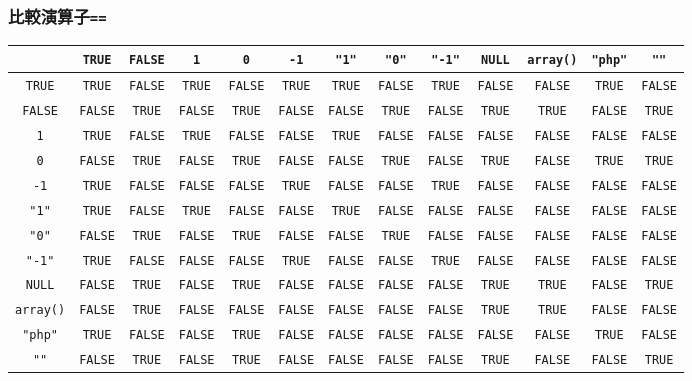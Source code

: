 \begin{frame}[containsverbatim]
\frametitle{比較演算子\texttt{==}}\tiny
\setlength{\tabcolsep}{0.2em}
\begin{center}
  \begin{tabular}{|*{13}{c|}}\hline
 &\verb+TRUE+&\verb+FALSE+&\verb+1+&\verb+0+&\verb+-1+&\verb+"1"+&\verb+"0"+&\verb+"-1"+&\verb+NULL+&\verb+array()+&\verb+"php"+&\verb+""+\\\hline
\verb+TRUE+&\verb+TRUE+&\verb+FALSE+&\verb+TRUE+&\verb+FALSE+&\verb+TRUE+&\verb+TRUE+&\verb+FALSE+&\verb+TRUE+&\verb+FALSE+&\verb+FALSE+&\verb+TRUE+&\verb+FALSE+\\\hline
\verb+FALSE+&\verb+FALSE+&\verb+TRUE+&\verb+FALSE+&\verb+TRUE+&\verb+FALSE+&\verb+FALSE+&\verb+TRUE+&\verb+FALSE+&\verb+TRUE+&\verb+TRUE+&\verb+FALSE+&\verb+TRUE+\\\hline
\verb+1+&\verb+TRUE+&\verb+FALSE+&\verb+TRUE+&\verb+FALSE+&\verb+FALSE+&\verb+TRUE+&\verb+FALSE+&\verb+FALSE+&\verb+FALSE+&\verb+FALSE+&\verb+FALSE+&\verb+FALSE+\\\hline
\verb+0+&\verb+FALSE+&\verb+TRUE+&\verb+FALSE+&\verb+TRUE+&\verb+FALSE+&\verb+FALSE+&\verb+TRUE+&\verb+FALSE+&\verb+TRUE+&\verb+FALSE+&\verb+TRUE+&\verb+TRUE+\\\hline
\verb+-1+&\verb+TRUE+&\verb+FALSE+&\verb+FALSE+&\verb+FALSE+&\verb+TRUE+&\verb+FALSE+&\verb+FALSE+&\verb+TRUE+&\verb+FALSE+&\verb+FALSE+&\verb+FALSE+&\verb+FALSE+\\\hline
\verb+"1"+&\verb+TRUE+&\verb+FALSE+&\verb+TRUE+&\verb+FALSE+&\verb+FALSE+&\verb+TRUE+&\verb+FALSE+&\verb+FALSE+&\verb+FALSE+&\verb+FALSE+&\verb+FALSE+&\verb+FALSE+\\\hline
\verb+"0"+&\verb+FALSE+&\verb+TRUE+&\verb+FALSE+&\verb+TRUE+&\verb+FALSE+&\verb+FALSE+&\verb+TRUE+&\verb+FALSE+&\verb+FALSE+&\verb+FALSE+&\verb+FALSE+&\verb+FALSE+\\\hline
\verb+"-1"+&\verb+TRUE+&\verb+FALSE+&\verb+FALSE+&\verb+FALSE+&\verb+TRUE+&\verb+FALSE+&\verb+FALSE+&\verb+TRUE+&\verb+FALSE+&\verb+FALSE+&\verb+FALSE+&\verb+FALSE+\\\hline
\verb+NULL+&\verb+FALSE+&\verb+TRUE+&\verb+FALSE+&\verb+TRUE+&\verb+FALSE+&\verb+FALSE+&\verb+FALSE+&\verb+FALSE+&\verb+TRUE+&\verb+TRUE+&\verb+FALSE+&\verb+TRUE+\\\hline
\verb+array()+&\verb+FALSE+&\verb+TRUE+&\verb+FALSE+&\verb+FALSE+&\verb+FALSE+&\verb+FALSE+&\verb+FALSE+&\verb+FALSE+&\verb+TRUE+&\verb+TRUE+&\verb+FALSE+&\verb+FALSE+\\\hline
\verb+"php"+&\verb+TRUE+&\verb+FALSE+&\verb+FALSE+&\verb+TRUE+&\verb+FALSE+&\verb+FALSE+&\verb+FALSE+&\verb+FALSE+&\verb+FALSE+&\verb+FALSE+&\verb+TRUE+&\verb+FALSE+\\\hline
\verb+""+&\verb+FALSE+&\verb+TRUE+&\verb+FALSE+&\verb+TRUE+&\verb+FALSE+&\verb+FALSE+&\verb+FALSE+&\verb+FALSE+&\verb+TRUE+&\verb+FALSE+&\verb+FALSE+&\verb+TRUE+\\\hline
  \end{tabular}
\end{center}
\end{frame}
